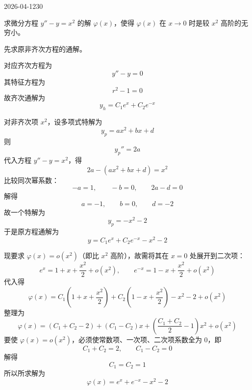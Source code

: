 \begin{mistake}{2026-04-12}{30}

\begin{problemcontent}
求微分方程 \( y''-y=x^2 \) 的解 \( \varphi(x) \)，使得 \( \varphi(x) \) 在 \( x\to 0 \) 时是较 \( x^2 \) 高阶的无穷小。
\end{problemcontent}

\begin{solutioncontent}
先求原非齐次方程的通解。

对应齐次方程为
\[
y''-y=0
\]
其特征方程为
\[
r^2-1=0
\]
故齐次通解为
\[
y_h=C_1e^x+C_2e^{-x}
\]

对非齐次项 \(x^2\)，设多项式特解为
\[
y_p=ax^2+bx+d
\]
则
\[
y_p''=2a
\]
代入方程 \(y''-y=x^2\)，得
\[
2a-(ax^2+bx+d)=x^2
\]
比较同次幂系数：
\[
-a=1,\qquad -b=0,\qquad 2a-d=0
\]
解得
\[
a=-1,\qquad b=0,\qquad d=-2
\]
故一个特解为
\[
y_p=-x^2-2
\]
于是原方程通解为
\[
y=C_1e^x+C_2e^{-x}-x^2-2
\]

现要求 \(\varphi(x)=o(x^2)\)（即比 \(x^2\) 高阶），故需将其在 \(x=0\) 处展开到二次项：
\[
e^x=1+x+\frac{x^2}{2}+o(x^2),\qquad e^{-x}=1-x+\frac{x^2}{2}+o(x^2)
\]
代入得
\[
\varphi(x)=C_1\left(1+x+\frac{x^2}{2}\right)+C_2\left(1-x+\frac{x^2}{2}\right)-x^2-2+o(x^2)
\]
整理为
\[
\varphi(x)=(C_1+C_2-2)+(C_1-C_2)x+\left(\frac{C_1+C_2}{2}-1\right)x^2+o(x^2)
\]
要使 \(\varphi(x)=o(x^2)\)，必须使常数项、一次项、二次项系数全为 0，即
\[
C_1+C_2=2,\qquad C_1-C_2=0
\]
解得
\[
C_1=C_2=1
\]
所以所求解为
\[
\varphi(x)=e^x+e^{-x}-x^2-2
\]
\end{solutioncontent}


\end{mistake}
